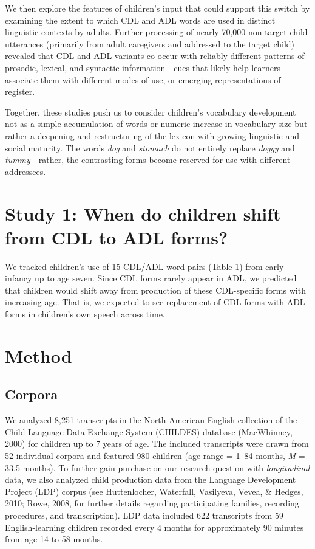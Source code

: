 \documentclass[10pt, letterpaper]{article}
\begin{document}
We then explore the features of children's input that could support this
switch by examining the extent to which CDL and ADL words are used in
distinct linguistic contexts by adults. Further processing of nearly
70,000 non-target-child utterances (primarily from adult caregivers and
addressed to the target child) revealed that CDL and ADL variants
co-occur with reliably different patterns of prosodic, lexical, and
syntactic information---cues that likely help learners associate them
with different modes of use, or emerging representations of register.

Together, these studies push us to consider children's vocabulary
development not as a simple accumulation of words or numeric increase in
vocabulary size but rather a deepening and restructuring of the lexicon
with growing linguistic and social maturity. The words \emph{dog} and
\emph{stomach} do not entirely replace \emph{doggy} and
\emph{tummy}---rather, the contrasting forms become reserved for use
with different addressees.

\hypertarget{study-1-when-do-children-shift-from-cdl-to-adl-forms}{%
\section{Study 1: When do children shift from CDL to ADL
forms?}\label{study-1-when-do-children-shift-from-cdl-to-adl-forms}}

We tracked children's use of 15 CDL/ADL word pairs (Table 1) from early
infancy up to age seven. Since CDL forms rarely appear in ADL, we
predicted that children would shift away from production of these
CDL-specific forms with increasing age. That is, we expected to see
replacement of CDL forms with ADL forms in children's own speech across
time.

\hypertarget{method}{%
\section{Method}\label{method}}

\hypertarget{corpora}{%
\subsection{Corpora}\label{corpora}}

We analyzed 8,251 transcripts in the North American English collection
of the Child Language Data Exchange System (CHILDES) database
(MacWhinney, 2000) for children up to 7 years of age. The included
transcripts were drawn from 52 individual corpora and featured 980
children (age range = 1--84 months, \emph{M} = 33.5 months). To further
gain purchase on our research question with \emph{longitudinal} data, we
also analyzed child production data from the Language Development
Project (LDP) corpus (see Huttenlocher, Waterfall, Vasilyeva, Vevea, \&
Hedges, 2010; Rowe, 2008, for further details regarding participating
families, recording procedures, and transcription). LDP data included
622 transcripts from 59 English-learning children recorded every 4
months for approximately 90 minutes from age 14 to 58 months.
\end{document}
